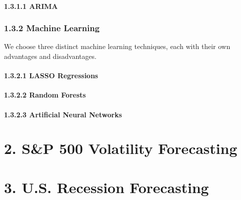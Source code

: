 \documentclass[]{article}
\let\oldparagraph\paragraph
\renewcommand{\paragraph}[1]{\oldparagraph{#1}\mbox{}}
\begin{document}
\paragraph{1.3.1.1 ARIMA}\label{arima}

\subsubsection{1.3.2 Machine Learning}\label{machine-learning}

We choose three distinct machine learning techniques, each with their
own advantages and disadvantages.

\paragraph{1.3.2.1 LASSO Regressions}\label{lasso-regressions}

\paragraph{1.3.2.2 Random Forests}\label{random-forests}

\paragraph{1.3.2.3 Artificial Neural
Networks}\label{artificial-neural-networks}

\section{2. S\&P 500 Volatility
Forecasting}\label{sp-500-volatility-forecasting}

\section{3. U.S. Recession
Forecasting}\label{u.s.-recession-forecasting}
\end{document}
